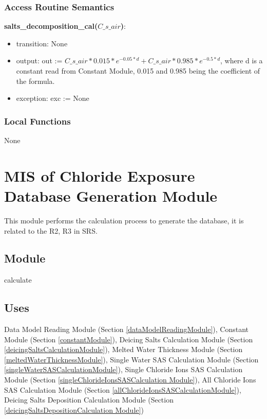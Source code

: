 \documentclass[12pt, titlepage]{article}
\begin{document}
\subsubsection{Access Routine Semantics}

\noindent \textbf{salts\_decomposition\_cal($C\_s\_air$)}:
\begin{itemize}
\item transition: None
\item output: out := $C\_s\_air * 0.015 * e^{-0.05*d}  + C\_s\_air*0.985 * e^{-0.5*d}$, where d is a constant read from Constant Module, 0.015 and 0.985 being the coefficient of the formula.
\item exception: exc := None
\end{itemize}

\subsubsection{Local Functions}
None
\newpage

\section{MIS of Chloride Exposure Database Generation Module} \label{calculationResultModule}
This module performs the calculation process to generate the database, it is related to the R2, R3 in SRS.


\subsection{Module}

calculate

\subsection{Uses}

Data Model Reading Module (Section \ref{dataModelReadingModule}), 
Constant Module (Section \ref{constantModule}), Deicing Salts Calculation Module (Section \ref{deicingSaltsCalculationModule}), Melted Water Thickness Module (Section \ref{meltedWaterThicknessModule}), Single Water SAS Calculation Module (Section \ref{singleWaterSASCalculationModule}), Single Chloride Ions SAS Calculation Module (Section \ref{singleChlorideIonsSASCalculation Module}), All Chloride Ions SAS Calculation Module (Section \ref{allChlorideIonsSASCalculationModule}), Deicing Salts Deposition Calculation Module (Section \ref{deicingSaltsDepositionCalculation Module})
\end{document}
